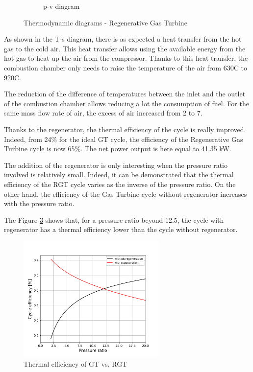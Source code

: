 \begin{figure}[h]
\begin{subfigure}[b]{0.4\textwidth}
         \caption{p-v diagram}
         \label{fig:C5_pv_RGT}
     \end{subfigure}
        \caption{Thermodynamic diagrams - Regenerative Gas Turbine}
        \label{fig:C5_thermo_diagram_RGT}
\end{figure}

As shown in the T-s diagram, there is as expected a heat transfer from the hot gas to the cold air. This heat transfer allows using the available energy from the hot gas to heat-up the air from the compressor. Thanks to this heat transfer, the combustion chamber only needs to raise the temperature of the air from 630\degree C to 920\degree C. 

The reduction of the difference of temperatures between the inlet and the outlet of the combustion chamber allows reducing a lot the consumption of fuel. For the same mass flow rate of air, the excess of air increased from 2 to 7.   

Thanks to the regenerator, the thermal efficiency of the cycle is really improved. Indeed, from 24\% for the ideal GT cycle, the efficiency of the Regenerative Gas Turbine cycle is now 65\%. The net power output is here equal to 41.35 kW.

The addition of the regenerator is only interesting when the pressure ratio involved is relatively small. Indeed, it can be demonstrated that the thermal efficiency of the RGT cycle varies as the inverse of the pressure ratio. On the other hand, the efficiency of the Gas Turbine cycle without regenerator increases with the pressure ratio. 

The Figure \ref{fig:C5_eff_RGT-GT} shows that, for a pressure ratio beyond 12.5, the cycle with regenerator has a thermal efficiency lower than the cycle without regenerator. 

\begin{figure}[h]
    \centering
    \includegraphics[width=0.65\textwidth]{Chapitre_5/Images/Efficiency_ideal_Brayton_regen.png}
    \caption{Thermal efficiency of GT vs. RGT}
    \label{fig:C5_eff_RGT-GT}
\end{figure}

